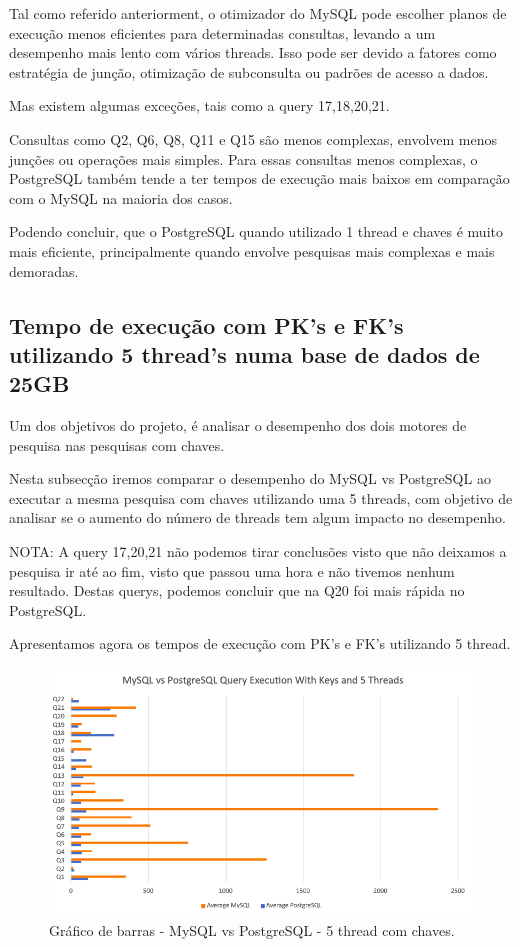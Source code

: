 \documentclass{article}
\begin{document}
Tal como referido anteriorment, o otimizador do MySQL pode escolher planos de execução menos eficientes para determinadas consultas, levando a um desempenho mais lento com vários threads. Isso pode ser devido a fatores como estratégia de junção, otimização de subconsulta ou padrões de acesso a dados. 


\texttt{}\par Mas existem algumas exceções, tais como a query 17,18,20,21.

Consultas como Q2, Q6, Q8, Q11 e Q15 são menos complexas, envolvem menos junções ou operações mais simples.
Para essas consultas menos complexas, o PostgreSQL também tende a ter tempos de execução mais baixos em comparação com o MySQL na maioria dos casos.

Podendo concluir, que o PostgreSQL quando utilizado 1 thread e chaves é muito mais eficiente, principalmente quando envolve pesquisas mais complexas e mais demoradas.

\clearpage
\subsection{Tempo de execução com PK's e FK's utilizando 5 thread's numa base
de dados de 25GB}

\texttt{}\par Um dos objetivos do projeto, é analisar o desempenho dos dois motores de pesquisa nas pesquisas com chaves.

Nesta subsecção iremos comparar o desempenho do MySQL vs PostgreSQL ao executar a mesma pesquisa com chaves utilizando uma 5 threads, com objetivo de analisar se o aumento do número de threads tem algum impacto no desempenho.


NOTA: A query 17,20,21 não podemos tirar conclusões visto que não deixamos a pesquisa ir até ao fim, visto que passou uma hora e não tivemos nenhum resultado. Destas querys, podemos concluir que na Q20 foi mais rápida no PostgreSQL.



Apresentamos agora os tempos de execução com PK's e FK's utilizando 5 thread.
\begin{figure}[H]
  \centering
  \includegraphics[width=\textwidth]{Graphs/mysqlvspostgres_withkeys_fivethreads.png}
  \caption{Gráfico de barras - MySQL vs PostgreSQL - 5 thread com chaves.}
  \label{fig:PKCreation2}
\end{figure}
\end{document}
